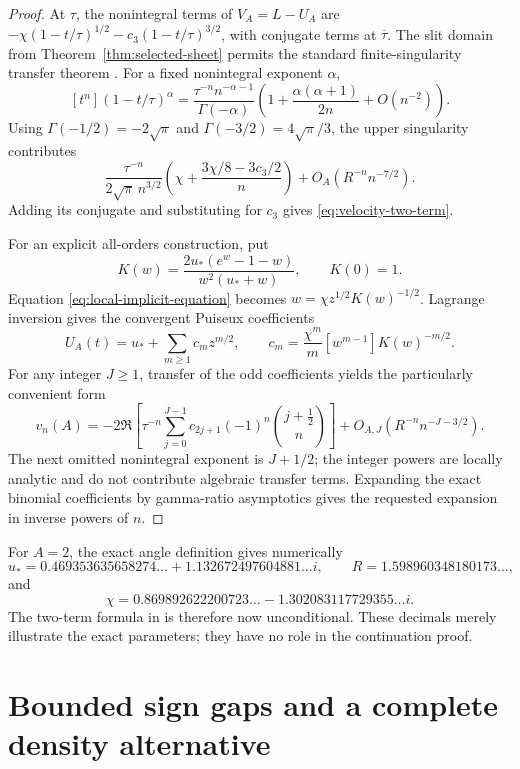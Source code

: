 \documentclass[11pt]{article}
\numberwithin{equation}{section}
\theoremstyle{definition}
\theoremstyle{remark}
\begin{document}
\begin{proof}
At $\tau$, the nonintegral terms of $V_A=L-U_A$ are
$-\chi(1-t/\tau)^{1/2}-c_3(1-t/\tau)^{3/2}$, with conjugate terms
at $\overline\tau$.  The slit domain from
Theorem~\ref{thm:selected-sheet} permits the standard finite-singularity
transfer theorem \cite[Chapter~VI]{FlajoletSedgewick2009}.  For a fixed
nonintegral exponent $\alpha$,
\[
 [t^n](1-t/\tau)^\alpha
 =\frac{\tau^{-n}n^{-\alpha-1}}{\Gamma(-\alpha)}
     \left(1+\frac{\alpha(\alpha+1)}{2n}+O(n^{-2})\right).
\]
Using $\Gamma(-1/2)=-2\sqrt\pi$ and
$\Gamma(-3/2)=4\sqrt\pi/3$, the upper singularity contributes
\[
 \frac{\tau^{-n}}{2\sqrt\pi\,n^{3/2}}
       \left(\chi+\frac{3\chi/8-3c_3/2}{n}\right)
       +O_A(R^{-n}n^{-7/2}).
\]
Adding its conjugate and substituting for $c_3$ gives
\eqref{eq:velocity-two-term}.

For an explicit all-orders construction, put
\[
 K(w)=\frac{2u_*(e^w-1-w)}{w^2(u_*+w)},\qquad K(0)=1.
\]
Equation \eqref{eq:local-implicit-equation} becomes
$w=\chi z^{1/2}K(w)^{-1/2}$.  Lagrange inversion gives the convergent
Puiseux coefficients
\begin{equation}\label{eq:all-puiseux-coefficients}
 U_A(t)=u_*+\sum_{m\geq1}c_mz^{m/2},\qquad
 c_m=\frac{\chi^m}{m}[w^{m-1}]K(w)^{-m/2}.
\end{equation}
For any integer $J\geq1$, transfer of the odd coefficients yields the
particularly convenient form
\begin{equation}\label{eq:binomial-all-order}
 v_n(A)=-2\Re\left[\tau^{-n}
       \sum_{j=0}^{J-1}c_{2j+1}(-1)^n\binom{j+\tfrac12}{n}\right]
       +O_{A,J}(R^{-n}n^{-J-3/2}).
\end{equation}
The next omitted nonintegral exponent is $J+1/2$; the integer powers
are locally analytic and do not contribute algebraic transfer terms.
Expanding the exact binomial coefficients by gamma-ratio asymptotics
gives the requested expansion in inverse powers of $n$.
\end{proof}

For $A=2$, the exact angle definition gives numerically
\[
 u_*=0.469353635658274\ldots+1.132672497604881\ldots i,
 \qquad R=1.598960348180173\ldots,
\]
and
\[
 \chi=0.869892622200723\ldots-1.302083117729355\ldots i.
\]
The two-term formula in \cite{HarmonicBaseline} is therefore now
unconditional.  These decimals merely illustrate the exact parameters;
they have no role in the continuation proof.

\section{Bounded sign gaps and a complete density alternative}
\label{sec:velocity-signs}
\end{document}
